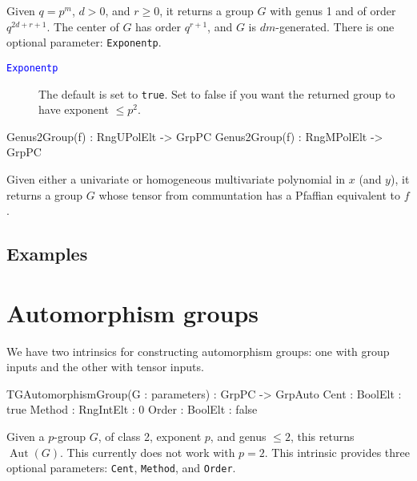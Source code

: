 \documentclass{documentation}
\DeclareMathOperator{\Aut}{Aut}
\begin{document}
Given $q=p^m$, $d>0$, and $r\geq 0$, it returns a group $G$ with genus 1 and of order $q^{2d+r+1}$.
The center of $G$ has order $q^{r+1}$, and $G$ is $dm$-generated.
There is one optional parameter: {\tt Exponentp}. 

\begin{description}
\item[\textcolor{blue}{\tt Exponentp}]
The default is set to {\tt true}.
Set to false if you want the returned group to have exponent $\leq p^2$.  
\end{description}

\begin{intrinsics}
Genus2Group(f) : RngUPolElt -> GrpPC
Genus2Group(f) : RngMPolElt -> GrpPC
\end{intrinsics}

Given either a univariate or homogeneous multivariate polynomial in $x$ (and $y$), it returns a group $G$ whose tensor from communtation has a Pfaffian equivalent to $f$.

\section{Examples}

\chapter{Automorphism groups}

We have two intrinsics for constructing automorphism groups: one with group inputs and the other with tensor inputs. 

\begin{intrinsics}
TGAutomorphismGroup(G : parameters) : GrpPC -> GrpAuto
    Cent : BoolElt : true
    Method : RngIntElt : 0 
    Order : BoolElt : false
\end{intrinsics}

Given a $p$-group $G$, of class 2, exponent $p$, and genus $\leq 2$, this returns $\Aut(G)$.
This currently does not work with $p=2$.
This intrinsic provides three optional parameters: {\tt Cent}, {\tt Method}, and {\tt Order}.
\end{document}
